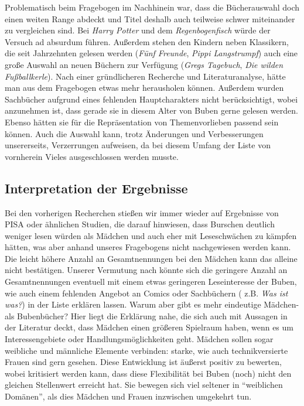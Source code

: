 

Problematisch beim Fragebogen im Nachhinein war, dass die Bücherauswahl
doch einen weiten Range abdeckt und Titel deshalb auch teilweise schwer
miteinander zu vergleichen sind. Bei \emph{Harry Potter} und dem
\emph{Regenbogenfisch} würde der Versuch ad absurdum führen. Außerdem
stehen den Kindern neben Klassikern, die seit Jahrzehnten gelesen werden
(\emph{Fünf Freunde}, \emph{Pippi Langstrumpf}) auch eine große Auswahl
an neuen Büchern zur Verfügung (\emph{Gregs Tagebuch}, \emph{Die wilden
Fußballkerle}). Nach einer gründlicheren Recherche und Literaturanalyse,
hätte man aus dem Fragebogen etwas mehr herausholen können. Außerdem
wurden Sachbücher aufgrund eines fehlenden Hauptcharakters nicht
berücksichtigt, wobei anzunehmen ist, dass gerade sie in diesem Alter
von Buben gerne gelesen werden. Ebenso hätten sie für die Repräsentation
von Themenvorlieben passend sein können. Auch die Auswahl kann, trotz
Änderungen und Verbesserungen unsererseits, Verzerrungen aufweisen, da
bei diesem Umfang der Liste von vornherein Vieles ausgeschlossen werden
musste.

\subsection{Interpretation der Ergebnisse}

Bei den vorherigen Recherchen stießen wir immer wieder auf Ergebnisse
von PISA oder ähnlichen Studien, die darauf hinwiesen, dass Burschen
deutlich weniger lesen würden als Mädchen und auch eher mit
Leseschwächen zu kämpfen hätten, was aber anhand unseres Fragebogens
nicht nachgewiesen werden kann. Die leicht höhere Anzahl an
Gesamtnennungen bei den Mädchen kann das alleine nicht bestätigen.
Unserer Vermutung nach könnte sich die geringere Anzahl an
Gesamtnennungen eventuell mit einem etwas geringeren Leseinteresse der
Buben, wie auch einem fehlenden Angebot an Comics oder Sachbüchern (
z.B. \emph{Was ist was?}) in der Liste erklären lassen. Warum aber gibt
es mehr eindeutige Mädchen- als Bubenbücher? Hier liegt die Erklärung
nahe, die sich auch mit Aussagen in der Literatur deckt, dass Mädchen
einen größeren Spielraum haben, wenn es um Interessengebiete oder
Handlungsmöglichkeiten geht. Mädchen sollen sogar weibliche und
männliche Elemente verbinden: starke, wie auch technikversierte Frauen
sind gern gesehen. Diese Entwicklung ist äußerst positiv zu bewerten,
wobei kritisiert werden kann, dass diese Flexibilität bei Buben (noch)
nicht den gleichen Stellenwert erreicht hat. Sie bewegen sich viel
seltener in ``weiblichen Domänen'', als dies Mädchen und Frauen
inzwischen umgekehrt tun.


